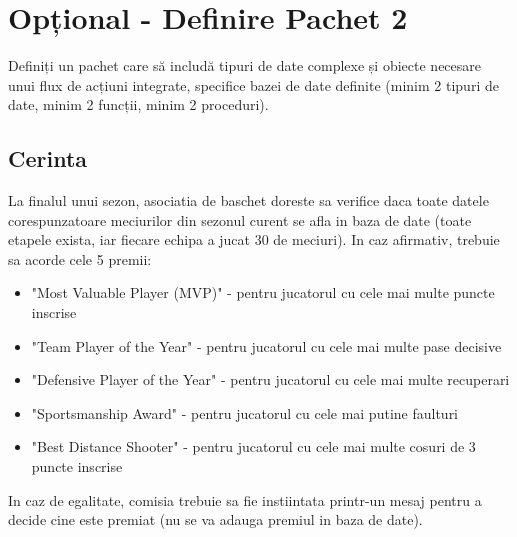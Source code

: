 \documentclass{article}
\begin{document}
\section{Opțional - Definire Pachet 2}
	Definiți un pachet care să includă tipuri de date complexe și obiecte necesare unui flux de acțiuni
	integrate, specifice bazei de date definite (minim 2 tipuri de date, minim 2 funcții, minim 2 proceduri). 

\subsection{Cerinta}
La finalul unui sezon, asociatia de baschet doreste sa verifice daca toate datele corespunzatoare meciurilor din sezonul curent se afla in baza de date (toate etapele exista, iar fiecare echipa a jucat 30 de meciuri). In caz afirmativ, trebuie sa acorde cele 5 premii:
\begin{itemize}
	\item "Most Valuable Player (MVP)" - pentru jucatorul cu cele mai multe puncte inscrise
	\item "Team Player of the Year" - pentru jucatorul cu cele mai multe pase decisive
	\item "Defensive Player of the Year" - pentru jucatorul cu cele mai multe recuperari
	\item "Sportsmanship Award" - pentru jucatorul cu cele mai putine faulturi
	\item "Best Distance Shooter" - pentru jucatorul cu cele mai multe cosuri de 3 puncte inscrise
\end{itemize}
In caz de egalitate, comisia trebuie sa fie instiintata printr-un mesaj pentru a decide cine este premiat (nu se va adauga premiul in baza de date).
	
\end{document}
